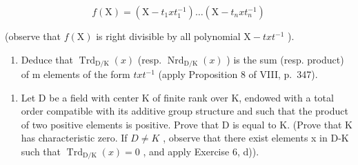 \[
f (\mathrm{X}) = \left(\mathrm{X} - t _ {1} x t _ {1} ^ {- 1}\right) \dots \left(\mathrm{X} - t _ {n} x t _ {n} ^ {- 1}\right)
\]

(observe that \(f(\mathrm{X})\) is right divisible by all polynomial \(\mathrm{X} - txt^{-1}\) ).

\begin{enumerate}
\def\labelenumi{\alph{enumi})}
\setcounter{enumi}{3}
\tightlist
\item
  Deduce that \(\operatorname{Trd}_{\mathrm{D}/\mathrm{K}}(x)\) (resp. \(\operatorname{Nrd}_{\mathrm{D}/\mathrm{K}}(x)\) ) is the sum (resp. product) of m elements of the form \(txt^{-1}\) (apply Proposition 8 of VIII, p.~347).
\end{enumerate}

\begin{enumerate}
\def\labelenumi{\arabic{enumi})}
\setcounter{enumi}{6}
\tightlist
\item
  Let D be a field with center K of finite rank over K, endowed with a total order compatible with its additive group structure and such that the product of two positive elements is positive. Prove that D is equal to K. (Prove that K has characteristic zero. If \(D \neq K\) , observe that there exist elements x in D-K such that \(\operatorname{Trd}_{\mathrm{D}/\mathrm{K}}(x) = 0\) , and apply Exercise 6, d)).
\end{enumerate}

